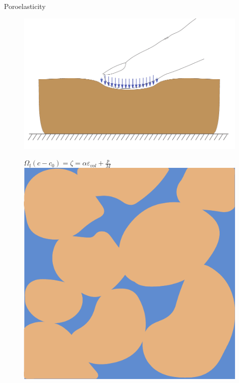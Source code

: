 \documentclass[aspectratio=169,xcolor=dvipsnames]{beamer}
\begin{document}
\begin{frame}{Poroelasticity}
	
	\begin{figure}
		\begin{minipage}{\linewidth}
			\begin{minipage}{0.3\linewidth}\centering
				\includegraphics[width=\linewidth]{punch.pdf}
			\end{minipage}\hfill
			\begin{minipage}{0.3\linewidth}\centering

\tiny{$\Omega_{\mathrm{f}}\left(c-c_{0}\right)=\zeta=\alpha \varepsilon_{v o l}+\frac{p}{M}$}
\\\vspace{0.1\linewidth} \includegraphics[width=0.4\linewidth]{pores.pdf}
			\end{minipage}\hfill
			\begin{minipage}{0.3\linewidth}\centering
	 \fontsize{3pt}{4pt}\selectfont{\def\svgwidth{\linewidth}
	}		
			\end{minipage}
		\end{minipage}
	\end{figure}


\end{frame}
\end{document}
